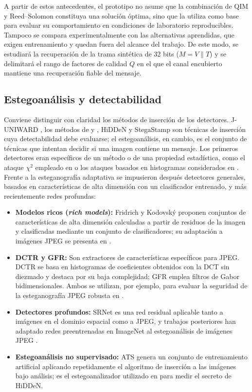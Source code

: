\documentclass[IB]{TFUOC}%
\begin{document}
A partir de estos antecedentes, el prototipo no asume que la combinación de QIM y Reed--Solomon constituya una solución óptima, sino que la utiliza como base para evaluar su comportamiento en condiciones de laboratorio reproducibles. Tampoco se compara experimentalmente con las alternativas aprendidas, que exigen entrenamiento y quedan fuera del alcance del trabajo. De este modo, se estudiará la recuperación de la trama sintética de 32 bits ($M = V \parallel T$) y se delimitará el rango de factores de calidad $Q$ en el que el canal encubierto mantiene una recuperación fiable del mensaje.

\subsection{Estegoanálisis y detectabilidad}
\label{subsec:estegoanalisis}

Conviene distinguir con claridad los métodos de inserción de los detectores. J-UNIWARD \cite{17}, los métodos de \cite{18} y \cite{20}, HiDDeN y StegaStamp son técnicas de inserción cuya detectabilidad debe evaluarse; el estegoanálisis, en cambio, es el conjunto de técnicas que intentan decidir si una imagen contiene un mensaje. Los primeros detectores eran específicos de un método o de una propiedad estadística, como el ataque $\chi^2$ empleado en \cite{13} o los ataques basados en histogramas considerados en \cite{15}. Frente a la esteganografía adaptativa se impusieron después detectores generales, basados en características de alta dimensión con un clasificador entrenado, y más recientemente redes profundas:

\begin{itemize}
    \item \textbf{Modelos ricos (\textit{rich models}):} Fridrich y Kodovský \cite{fridrich2012rich} proponen conjuntos de características de alta dimensión calculadas a partir de residuos de la imagen y clasificadas mediante un conjunto de clasificadores; su adaptación a imágenes JPEG se presenta en \cite{kodovsky2012jpegrich}.
    \item \textbf{DCTR y GFR:} Son extractores de características específicos para JPEG. DCTR \cite{holub2015dctr} se basa en histogramas de coeficientes obtenidos con la DCT sin diezmado y destaca por su baja complejidad; GFR \cite{song2015gfr} emplea filtros de Gabor bidimensionales. Ambos se utilizan, por ejemplo, para evaluar la seguridad de la esteganografía JPEG robusta en \cite{18}.
    \item \textbf{Detectores profundos:} SRNet \cite{boroumand2019srnet} es una red residual aplicable tanto a imágenes en el dominio espacial como a JPEG, y trabajos posteriores han adaptado redes preentrenadas en ImageNet al estegoanálisis de imágenes JPEG \cite{yousfi2020imagenet}.
    \item \textbf{Estegoanálisis no supervisado:} ATS \cite{lerch2016ats} genera un conjunto de entrenamiento artificial aplicando repetidamente el algoritmo de inserción a las imágenes bajo análisis; es el estegoanalizador utilizado en \cite{zhu2018hidden} para medir el secreto de HiDDeN.
\end{itemize}
\end{document}
